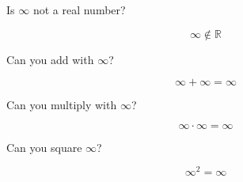 \documentclass{ximera}
\begin{document}
\begin{question} 


Is $\infty$ not a real number?

\[  \infty \notin \mathbb{R}  \]


\begin{multipleChoice}
\end{multipleChoice}


\end{question}










\newpage


\begin{question} 


Can you add with $\infty$?

\[  \infty + \infty = \infty \]


\begin{multipleChoice}
\end{multipleChoice}


\end{question}










\begin{question} 


Can you multiply with $\infty$?

\[  \infty \cdot \infty = \infty \]


\begin{multipleChoice}
\end{multipleChoice}


\end{question}









\begin{question} 


Can you square $\infty$?

\[  \infty^2 = \infty \]


\begin{multipleChoice}
\end{multipleChoice}


\end{question}
\end{document}
